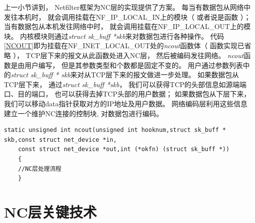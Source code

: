 \par

上一小节讲到，
Netfilter框架为NC层的实现提供了方案。
每当有数据包从网络中发往本机时，
就会调用挂载在NF\_IP\_LOCAL\_IN上的模块（ 或者说是函数 ）；
当有数据包从本机发往网络中时，
就会调用挂载在NF\_IP\_LOCAL\_OUT上的模块。
内核模块则通过\emph{struct sk\_buff *skb}来对数据包进行各种操作。
代码\ref{NCOUT}即为挂载在NF\_INET\_LOCAL\_OUT处的\emph{ncout}函数体（ 函数实现已省略 ），
TCP层下来的报文从此函数处进入NC层，
然后被编码发往网络。
\emph{ncout}函数是由用户编写，
但是其参数类型和个数都是固定不变的。
用户通过参数列表中的\emph{struct sk\_buff * skb}来对从TCP层下来的报文做进一步处理。
如果数据包从TCP层下来，
通过\emph{struct sk\_buff *skb}，
我们可以获得TCP的头部信息如源端端口、目的端口，
也可以获得去掉TCP头部的用户数据；
如果数据包从下层下来，
我们可以移动data指针获取对方的IP地址及用户数据。
网络编码层利用这些信息建立一个维护NC连接的控制块,
对数据包进行编码。
	\begin{lstlisting}[caption=NF\_INET\_LOCAL\_OUT钩子点函数,label={NCOUT},language={[ANSI]C}]
	static unsigned int ncout(unsigned int hooknum,struct sk_buff * skb,const struct net_device *in,
	const struct net_device *out,int (*okfn) (struct sk_buff *))
	{
	//NC层处理流程	
	} 
	\end{lstlisting}

\section{NC层关键技术}
